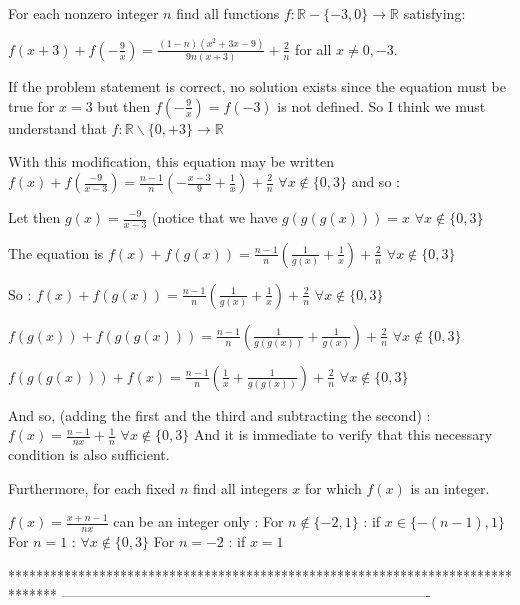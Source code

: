 \begin{solution}
	\begin{tcolorbox}For each nonzero integer $ n$ find all functions $ f: \mathbb{R} - \{ - 3,0 \} \rightarrow \mathbb{R}$ satisfying:

$ f(x + 3) + f \left( - \frac {9}{x} \right) = \frac {(1 - n)(x^2 + 3x - 9)}{9n(x + 3)} + \frac {2}{n}$ for all $ x \not = 0, - 3.$\end{tcolorbox}
If the problem statement is correct, no solution exists since the equation must be true for $ x=3$ but then $ f(-\frac 9x)=f(-3)$ is not defined.
So I think we must understand that $ f: \mathbb R\backslash\{0,+3\}\to\mathbb R$

With this modification, this equation may be written $ f(x)+f(\frac{-9}{x-3})=\frac{n-1}{n}(-\frac{x-3}{9}+\frac 1x)+\frac 2n$ $ \forall x\notin\{0,3\}$ and so :

Let then $ g(x)=\frac{-9}{x-3}$ (notice that we have $ g(g(g(x)))=x$ $ \forall x\notin\{0,3\}$

The equation is $ f(x)+f(g(x))=\frac{n-1}{n}(\frac{1}{g(x)}+\frac{1}{x})+\frac 2n$ $ \forall x\notin\{0,3\}$

So :
$ f(x)+f(g(x))=\frac{n-1}{n}(\frac{1}{g(x)}+\frac{1}{x})+\frac 2n$ $ \forall x\notin\{0,3\}$

$ f(g(x))+f(g(g(x)))=\frac{n-1}{n}(\frac{1}{g(g(x))}+\frac{1}{g(x)})+\frac 2n$ $ \forall x\notin\{0,3\}$

$ f(g(g(x)))+f(x)=\frac{n-1}{n}(\frac{1}{x}+\frac{1}{g(g(x))})+\frac 2n$ $ \forall x\notin\{0,3\}$

And so, (adding the first and the third and subtracting the second) : $ \boxed{f(x)=\frac{n-1}{nx}+\frac 1n}$ $ \forall x\notin\{0,3\}$
And it is immediate to verify that this necessary condition is also sufficient.

\begin{tcolorbox}Furthermore, for each fixed $ n$ find all integers $ x$ for which $ f(x)$ is an integer.\end{tcolorbox}

$ f(x)=\frac{x+n-1}{nx}$ can be an integer only :
For $ n\notin\{-2,1\}$ : if $ x\in\{-(n-1),1\}$
For $ n=1$ : $ \forall x\notin\{0,3\}$
For $ n=-2$ : if $ x=1$
\end{solution}
*******************************************************************************
-------------------------------------------------------------------------------

